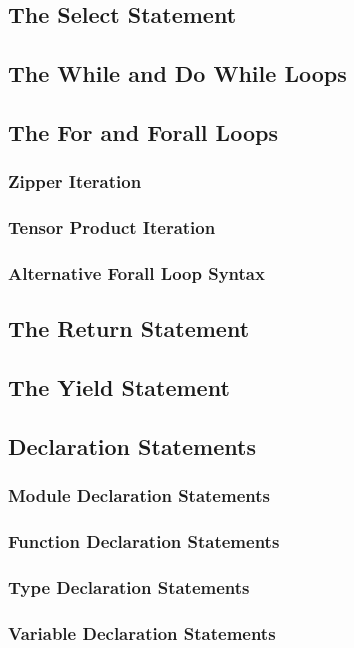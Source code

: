 \documentclass[10pt,twoside,titlepage]{article}
\begin{document}
\subsection{The Select Statement}
\subsection{The While and Do While Loops}
\subsection{The For and Forall Loops}
\subsubsection{Zipper Iteration}
\subsubsection{Tensor Product Iteration}
\subsubsection{Alternative Forall Loop Syntax}
\subsection{The Return Statement}
\subsection{The Yield Statement}
\subsection{Declaration Statements}
\subsubsection{Module Declaration Statements}
\subsubsection{Function Declaration Statements}
\subsubsection{Type Declaration Statements}
\subsubsection{Variable Declaration Statements}
\end{document}

